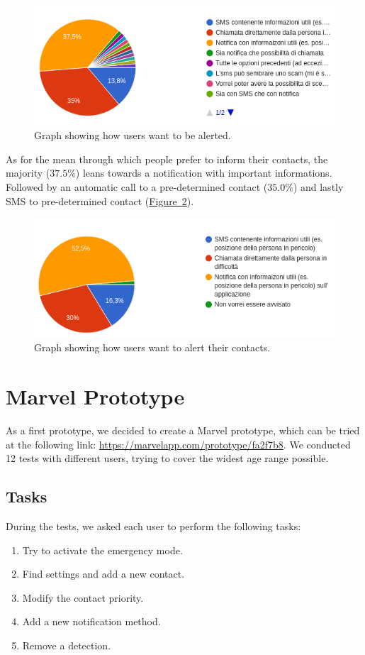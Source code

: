 \documentclass[12pt]{article}
\begin{document}
\begin{figure}[ht]
    \centering
    \includegraphics[width=.7\textwidth]{Images/alert_me.png}
    \caption{Graph showing how users want to be alerted.}
    \label{fig:alert_me}
\end{figure}

As for the mean through which people prefer to inform their contacts,
the majority ($37.5\%$) leans towards a notification with important informations.
Followed by an automatic call to a pre-determined contact ($35.0\%$) and lastly SMS 
to pre-determined contact (\hyperref[fig:alert_others]{Figure~\ref*{fig:alert_others}}).

\begin{figure}[ht]
    \centering
    \includegraphics[width=.7\textwidth]{Images/alert_others.png}
    \caption{Graph showing how users want to alert their contacts.}
    \label{fig:alert_others}
\end{figure}

\section{Marvel Prototype}
As a first prototype, we decided to create a Marvel prototype, which can be tried 
at the following link: \url{https://marvelapp.com/prototype/fa2f7b8}. 
We conducted 12 tests with different users, trying to cover the widest 
age range possible. 

\subsection{Tasks}
During the tests, we asked each user to perform the following tasks:
\begin{enumerate}
    \item Try to activate the emergency mode. 
    \item Find settings and add a new contact.
    \item Modify the contact priority.
    \item Add a new notification method.
    \item Remove a detection.
\end{enumerate}
\end{document}
